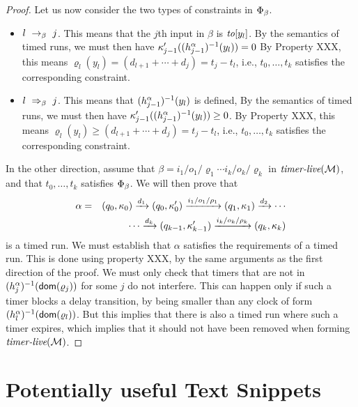 \begin{proof}
 Let us now consider the two types of constraints in $\Phi_{\beta}$.
 \begin{itemize}
 \item $l \ \rightarrow_{\beta} \  j$. This means that the $j$th input in $\beta$ is
   $\mathit{to}[y_l]$. By the semantics of timed runs, we must then have
   $\kappa_{j-1}'((h_{j-1}^{\alpha})^{-1}(y_l)) = 0$ By Property XXX, this means
   $\varrho_l(y_l) = (d_{l+1} + \cdots + d_j) = t_j - t_l$, i.e.,
   $t_0, \ldots, t_k$ satisfies the corresponding constraint.
 \item $l \ \Rightarrow_{\beta}\  j$. This means that $(h_{j-1}^{\alpha})^{-1}(y_l)$
   is defined, 
   By the semantics of timed runs, we must then have
   $\kappa_{j-1}'((h_{j-1}^{\alpha})^{-1}(y_l)) \geq 0$.
   By Property XXX, this means
   $\varrho_l(y_l) \geq (d_{l+1} + \cdots + d_j) = t_j - t_l$, i.e.,
   $t_0, \ldots, t_k$ satisfies the corresponding constraint.
 \end{itemize}
In the other direction, assume that 
 $\beta = {i_1/o_1/\varrho_1}  \cdots {i_k/o_k/\varrho_k}$
   in $\mbox{\it timer-live}({{\mathcal M}})$,
and that
$t_0, \ldots, t_k$ satisfies $\Phi_{\beta}$.
We will then prove that
\begin{eqnarray*}
\alpha & = & (q_0,\kappa_0) \xrightarrow{d_1} (q_0,\kappa_0') \xrightarrow{i_1/o_1/\rho_1} (q_1,\kappa_1) \xrightarrow{d_2} 
\cdots
\\ && \qquad \cdots
\xrightarrow{d_k} (q_{k-1},\kappa_{k-1}') \xrightarrow{i_k/o_k/\rho_k} (q_k,\kappa_k)
\end{eqnarray*}
is a timed run. We must establish that $\alpha$
satisfies the requirements of a timed run. This is done
using property XXX, by the same arguments
as the first direction of the proof. We must only check that timers that
are not in $(h_{j}^{\alpha})^{-1}({\textsf{dom}}(\varrho_j))$ for some $j$ do not
interfere. This can happen only if such a timer blocks a delay transition,
by being smaller than any clock of form
$(h_{l}^{\alpha})^{-1}({\textsf{dom}}(\varrho_l))$.
But this implies that there is also a timed run where such a timer expires,
which implies that it should not have been removed when forming
$\mbox{\it timer-live}({{\mathcal M}})$.
\end{proof}

\section{Potentially useful Text Snippets}


